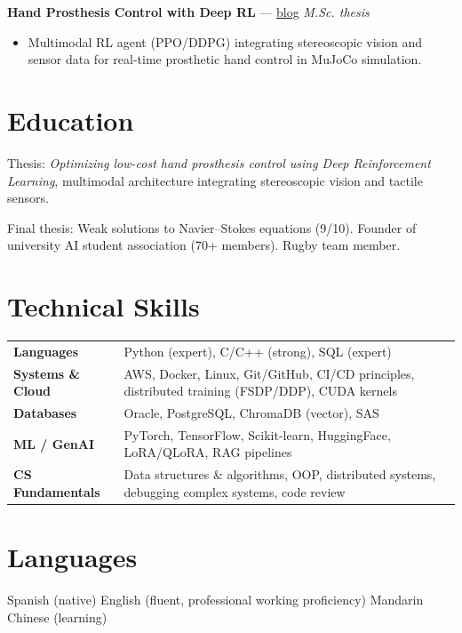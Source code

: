 \documentclass[10pt,a4paper]{article}
\begin{document}
\vspace{4pt}
\noindent
\textbf{Hand Prosthesis Control with Deep RL} --- \href{https://alektebel.github.io/blog/master-thesis-reinforcement-learning.html}{blog} \hfill \textit{M.Sc. thesis}
\begin{itemize}
  \item Multimodal RL agent (PPO/DDPG) integrating stereoscopic vision and sensor data for real-time prosthetic hand control in MuJoCo simulation.
\end{itemize}

\section{Education}

\par Thesis: \emph{Optimizing low-cost hand prosthesis control using Deep Reinforcement Learning}, multimodal architecture integrating stereoscopic vision and tactile sensors.

\vspace{4pt}
\par Final thesis: Weak solutions to Navier--Stokes equations (9/10). Founder of university AI student association (70+ members). Rugby team member.

\section{Technical Skills}

\renewcommand{\arraystretch}{1.25}
\begin{tabularx}{\linewidth}{@{} l X @{}}
  \textbf{Languages}        & Python (expert), C/C++ (strong), SQL (expert) \\
  \textbf{Systems \& Cloud} & AWS, Docker, Linux, Git/GitHub, CI/CD principles, distributed training (FSDP/DDP), CUDA kernels \\
  \textbf{Databases}        & Oracle, PostgreSQL, ChromaDB (vector), SAS \\
  \textbf{ML / GenAI}       & PyTorch, TensorFlow, Scikit-learn, HuggingFace, LoRA/QLoRA, RAG pipelines \\
  \textbf{CS Fundamentals}  & Data structures \& algorithms, OOP, distributed systems, debugging complex systems, code review \\
\end{tabularx}

\section{Languages}
Spanish (native) \quad English (fluent, professional working proficiency) \quad Mandarin Chinese (learning)
\end{document}
